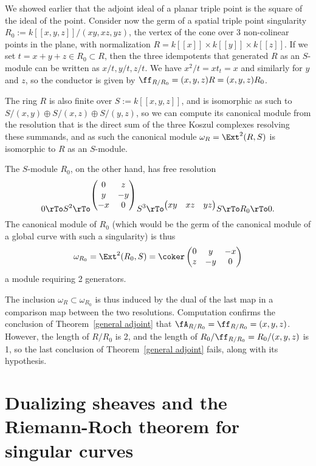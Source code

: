 \begin{example}\label{nongorenstein}
We showed earlier that the adjoint ideal of a planar triple point is the square of the ideal of the point. Consider now
  the germ of a spatial triple point singularity $R_0 := k[[x,y,z]]/(xy, xz,yz)$, the vertex of the cone over 3
 non-colinear points in the plane, with normalization $R = k[[x]]\times k[[y]]\times k[[z]]$.
 If we set $t = x+y+z\in R_0\subset R$, then the three idempotents that generated $R$ as an $S$-module
 can be written as $x/t, y/t, z/t$. We have $x^2/t = xt_t= x$ and similarly for $y$ and $z$, so
 the conductor is given by $\ff_{R/R_0} = (x,y,z)R = (x,y,z)R_0$.
 
 The ring $R$ is also finite over $S := k[[x,y,z]]$, and is isomorphic as such to 
 $S/(x,y)\oplus S/(x,z) \oplus S/(y,z)$, so we can compute its canonical module from the
 resolution that is the direct sum of the three Koszul complexes resolving these summands, and 
 as such the canonical module $\omega_R = \Ext^2(R,S)$ is isomorphic to $R$ as an $S$-module.
 

 The $S$-module $R_0$, on the other hand,   has free resolution
 $$
 0\rTo S^2\rTo^{
	\begin{pmatrix}
 0&z\\
 y&-y\\
 -x&0
\end{pmatrix}}
 S^3 \rTo^{
\begin{pmatrix}
 xy&xz&yz
\end{pmatrix}}
 S \rTo R_0 \rTo 0. 
 $$
The canonical module of $R_0$ (which would be the germ of the canonical module of a global curve with such a singularity) is thus 
 $$
 \omega_{R_0} = \Ext^2(R_0, S) = 
 \coker 
\begin{pmatrix}
 0&y&-x\\z&-y&0
\end{pmatrix}
$$
a module requiring 2 generators.
\end{example}
The inclusion $\omega_{R} \subset \omega_{R_0}$ is thus induced by the 
dual of the last map in a comparison map between the two resolutions. Computation
confirms the conclusion of Theorem~\ref{general adjoint} that $\fA_{R/R_0} = \ff_{R/R_0} = (x,y,z)$. However, the length of $R/R_0$ is 2, and the length of $R_0/\ff_{R/R_0} = R_0/(x,y,z)$ is  1, so the
last conclusion of Theorem~\ref{general adjoint} fails, along with its hypothesis.

\section{Dualizing sheaves and the Riemann-Roch theorem for singular curves }\label{duality}

